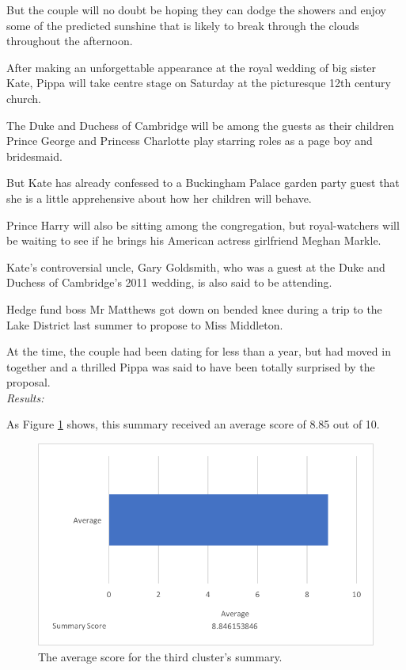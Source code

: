 \documentclass[12pt]{article}
\begin{document}
But the couple will no doubt be hoping they can dodge the showers and enjoy some of the predicted sunshine that is likely to break through the clouds throughout the afternoon.

After making an unforgettable appearance at the royal wedding of big sister Kate, Pippa will take centre stage on Saturday at the picturesque 12th century church.

The Duke and Duchess of Cambridge will be among the guests as their children Prince George and Princess Charlotte play starring roles as a page boy and bridesmaid.

But Kate has already confessed to a Buckingham Palace garden party guest that she is a little apprehensive about how her children will behave.

Prince Harry will also be sitting among the congregation, but royal-watchers will be waiting to see if he brings his American actress girlfriend Meghan Markle.

Kate's controversial uncle, Gary Goldsmith, who was a guest at the Duke and Duchess of Cambridge's 2011 wedding, is also said to be attending.

Hedge fund boss Mr Matthews got down on bended knee during a trip to the Lake District last summer to propose to Miss Middleton.

At the time, the couple had been dating for less than a year, but had moved in together and a thrilled Pippa was said to have been totally surprised by the proposal. \\

\emph{Results:}

As Figure \ref{summ3} shows, this summary received an average score of 8.85 out of 10. \\

\begin{figure}[ht!]
  \centering
    \includegraphics[scale=0.7]{summ3score.png}
   \caption[The average score for a summary]{The average score for the third cluster's summary.}
   \label{summ3}
\end{figure} 
\end{document}

